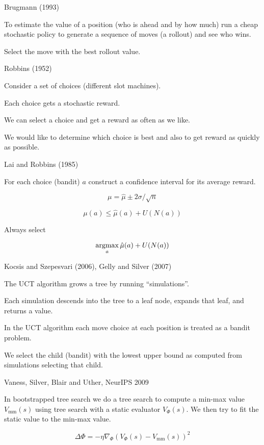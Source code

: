 {\vfill

{Brugmann (1993)}

To estimate the value of a position (who is ahead and by how much)
run a cheap stochastic policy to generate a sequence of moves (a rollout) and see who wins.

\vfill
Select the move with the best rollout value.

{Robbins (1952)}

Consider a set of choices (different slot machines).

Each choice gets a stochastic reward.

\vfill
We can select a choice and get a reward as often as we like.

\vfill
We would like to determine which choice is best and also to get reward as quickly as possible.

{Lai and Robbins (1985)}

For each choice (bandit) $a$ construct a confidence interval for its average reward.

\vfill
$$\mu = \hat{\mu} \pm 2\sigma/\sqrt{n}$$

\vfill
$$\mu(a) \leq \hat{\mu}(a) + U(N(a))$$

\vfill
Always select

$$\operatorname*{argmax}_a \hat{\mu}(a) + U(N(a))$$

{Kocsis and Szepesvari (2006), Gelly and Silver (2007)}

The UCT algorithm grows a tree by running ``simulations''.

\vfill
Each simulation descends into the tree to a leaf node, expands that leaf, and returns a value.

\vfill
In the UCT algorithm each move choice at each position is treated as a bandit problem.

\vfill
We select the child (bandit) with the lowest upper bound as computed from simulations selecting that child.


{Vaness, Silver, Blair and Uther, NeurIPS 2009}

In bootstrapped tree search we do a tree search to compute a min-max value $V_{\mathrm{mm}}(s)$
using tree search with a static evaluator $V_\Phi(s)$.  We then try to fit the static value to the min-max value.

\vfill
$$\Delta \Phi = - \eta \nabla_\Phi \left(V_\Phi(s) - V_{\mathrm{mm}}(s)\right)^2$$

}

